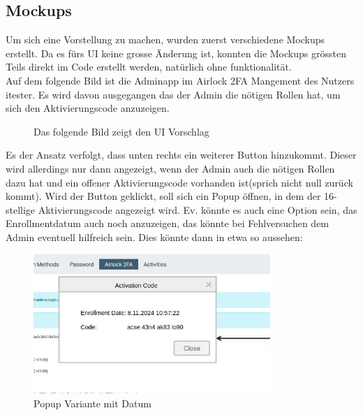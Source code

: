 \subsection{Mockups}
Um sich eine Vorstellung zu machen, wurden zuerst verschiedene Mockups erstellt. Da es fürs UI keine grosse Änderung ist, konnten die Mockups grössten Teils direkt im Code erstellt werden, natürlich ohne funktionalität. \newline\\
Auf dem folgende Bild ist die Adminapp im Airlock 2FA Mangement des Nutzers \flqq itester\frqq{}. Es wird davon ausgegangen das der Admin die nötigen Rollen hat, um sich den Aktivierungscode anzuzeigen. 
\begin{figure}[H]
	\begin{center}
		\caption[UI Mockup]{Das folgende Bild zeigt den UI Vorschlag}\label{fig:mockup1}
	\end{center}
\end{figure}
\begin{landscape}
	
\end{landscape}
\noindent Es der Ansatz verfolgt, dass unten rechts ein weiterer Button hinzukommt. Dieser wird allerdings nur dann angezeigt, wenn der Admin auch die nötigen Rollen dazu hat und ein offener Aktivierungscode vorhanden ist(sprich nicht null zurück kommt). Wird der Button geklickt, soll sich ein Popup öffnen, in dem der 16-stellige Aktivierungscode angezeigt wird. Ev. könnte es auch eine Option sein, das Enrollmentdatum auch noch anzuzeigen, das könnte bei Fehlversuchen dem Admin eventuell hilfreich sein. Dies könnte dann in etwa so aussehen:
\begin{figure}[H]
	\begin{center}
		\includegraphics[width=0.8\textwidth]{ressourcen/popup}
		\caption[Popup mit Datum]{Popup Variante mit Datum}\label{fig:restflow}
	\end{center}
\end{figure}

